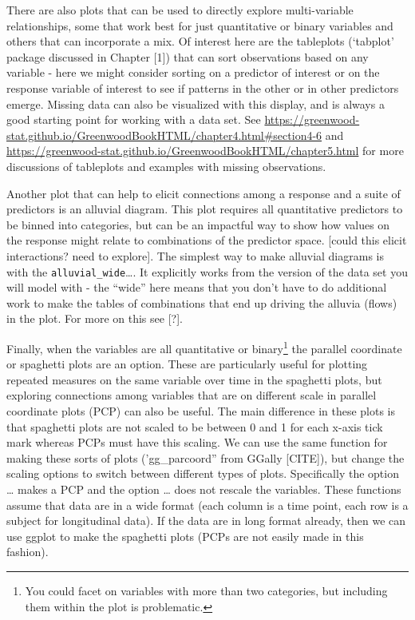 \documentclass[
]{book}
\begin{document}
There are also plots that can be used to directly explore multi-variable relationships, some that work best for just quantitative or binary variables and others that can incorporate a mix. Of interest here are the tableplots (`tabplot' package discussed in Chapter {[}1{]}) that can sort observations based on any variable - here we might consider sorting on a predictor of interest or on the response variable of interest to see if patterns in the other or in other predictors emerge. Missing data can also be visualized with this display, and is always a good starting point for working with a data set. See \url{https://greenwood-stat.github.io/GreenwoodBookHTML/chapter4.html\#section4-6} and \url{https://greenwood-stat.github.io/GreenwoodBookHTML/chapter5.html} for more discussions of tableplots and examples with missing observations.

Another plot that can help to elicit connections among a response and a suite of predictors is an alluvial diagram. This plot requires all quantitative predictors to be binned into categories, but can be an impactful way to show how values on the response might relate to combinations of the predictor space. {[}could this elicit interactions? need to explore{]}. The simplest way to make alluvial diagrams is with the \texttt{alluvial\_wide}\ldots. It explicitly works from the version of the data set you will model with - the ``wide'' here means that you don't have to do additional work to make the tables of combinations that end up driving the alluvia (flows) in the plot. For more on this see {[}?{]}.

Finally, when the variables are all quantitative or binary\footnote{You could facet on variables with more than two categories, but including them within the plot is problematic.} the parallel coordinate or spaghetti plots are an option. These are particularly useful for plotting repeated measures on the same variable over time in the spaghetti plots, but exploring connections among variables that are on different scale in parallel coordinate plots (PCP) can also be useful. The main difference in these plots is that spaghetti plots are not scaled to be between 0 and 1 for each x-axis tick mark whereas PCPs must have this scaling. We can use the same function for making these sorts of plots ('gg\_parcoord'' from GGally {[}CITE{]}), but change the scaling options to switch between different types of plots. Specifically the option \ldots{} makes a PCP and the option \ldots{} does not rescale the variables. These functions assume that data are in a wide format (each column is a time point, each row is a subject for longitudinal data). If the data are in long format already, then we can use ggplot to make the spaghetti plots (PCPs are not easily made in this fashion).
\end{document}
